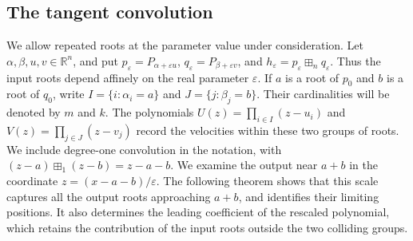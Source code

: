 \documentclass[12pt,reqno]{amsart}
\theoremstyle{definition}
\theoremstyle{remark}
\newcommand{\R}{\mathbb R}
\newcommand{\eps}{\varepsilon}
\begin{document}
\subsection{The tangent convolution}

We allow repeated roots at the parameter value under consideration.  Let
\(\alpha,\beta,u,v\in\R^n\), and put
\(p_\eps=P_{\alpha+\eps u}\), \(q_\eps=P_{\beta+\eps v}\), and
\(h_\eps=p_\eps\boxplus_nq_\eps\).  Thus the input roots depend
affinely on the real parameter \(\eps\).  If \(a\) is a root of
\(p_0\) and \(b\) is a root of \(q_0\), write
\(I=\{i:\alpha_i=a\}\) and \(J=\{j:\beta_j=b\}\).  Their
cardinalities will be denoted by \(m\) and \(k\).  The polynomials
\(U(z)=\prod_{i\in I}(z-u_i)\) and
\(V(z)=\prod_{j\in J}(z-v_j)\) record the velocities within these
two groups of roots.  We include degree-one convolution in the notation,
with \((z-a)\boxplus_1(z-b)=z-a-b\).
We examine the output near \(a+b\) in the coordinate \(z=(x-a-b)/\varepsilon\). The following theorem shows that this scale captures all the output roots approaching \(a+b\), and identifies their limiting positions. It also determines the leading coefficient of the rescaled polynomial, which retains the contribution of the input roots outside the two colliding groups.
\end{document}
